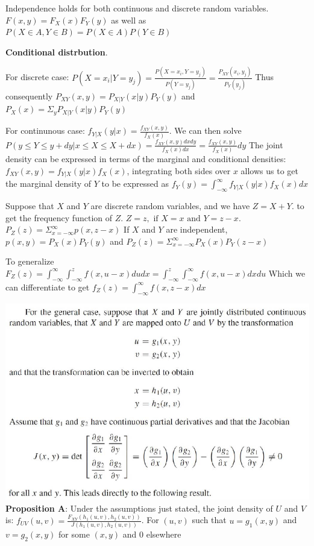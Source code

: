 \documentclass{article}
\begin{document}
\begin{multicols*}{2}
    Independence holds for both continuous and discrete random variables.
    $F(x, y) = F_X(x)F_Y(y)$ as well as $P(X\in A, Y \in B) = P(X\in A) P (Y \in B)$

    \textbf{Conditional distrbution}.

    For discrete case: $P(X=x_i | Y=y_j) = \frac{P(X=x_i, Y=y_j)}{P(Y=y_j)} = \frac{P_{XY}(x_i, y_j)}{P_Y(y_j)}$
    Thus consequently $P_{XY}(x, y) = P_{X|Y}(x|y)P_Y(y)$ and $P_X(x) = \Sigma_y P_{X|Y}\left(x|y\right) P_Y(y)$

    For continunous case: $f_{Y|X}(y|x) = \frac{f_{XY}(x, y)}{f_X(x)}$.
    We can then solve $P(y \leq Y \leq y + dy | x \leq X \leq X+dx) = \frac{f_{XY}(x, y)dx dy}{f_X(x) dx} = \frac{f_{XY}(x, y)}{f_X(x)}dy$
    The joint density can be expressed in terms of the marginal and conditional densities:
    $f_{XY}(x, y) = f_{Y|X}(y|x)f_X(x)$, integrating both sides over $x$ allows us to get the marginal density of $Y$ to be expressed as
    $f_Y(y) = \int_{-\infty}^\infty f_{Y|X}(y|x)f_X(x) dx$

    Suppose that $X$ and $Y$ are discrete random variables, and we have $Z = X + Y$. to get the frequency function of $Z$.
    $Z=z, \text{ if } X=x \text{ and } Y =z-x$.
    $P_Z(z) = \Sigma^\infty_{x=-\infty} p(x, z-x)$
    If $X$ and $Y$ are independent, $p(x, y) = P_X(x)P_Y(y)$ and $P_Z(z) = \Sigma^\infty_{x=-\infty}P_X(x)P_Y(z-x)$

    To generalize $F_Z(z) = \int^\infty_{-\infty} \int^z_{-\infty} f(x, u-x) du dx = \int^z_{-\infty} \int^\infty_{-\infty} f(x, u-x) dx du$
    Which we can differentiate to get $f_Z(z) = \int^\infty_{-\infty} f(x, z-x) dx$

    \includegraphics[width=0.9\columnwidth]{3_6_2_1.png}
    \textbf{Proposition A}: Under the assumptions just stated, the joint density of $U$ and $V$ is:
    $f_{UV}(u, v) = \frac{F_{XY}(h_1(u, v), h_2(u, v))}{J(h_1(u, v), h_2(u, v))}$.
    For $(u, v)$ such that $u=g_1(x, y)$ and $v=g_2(x, y)$ for some $(x, y)$ and 0 elsewhere


\end{multicols*}
\end{document}
